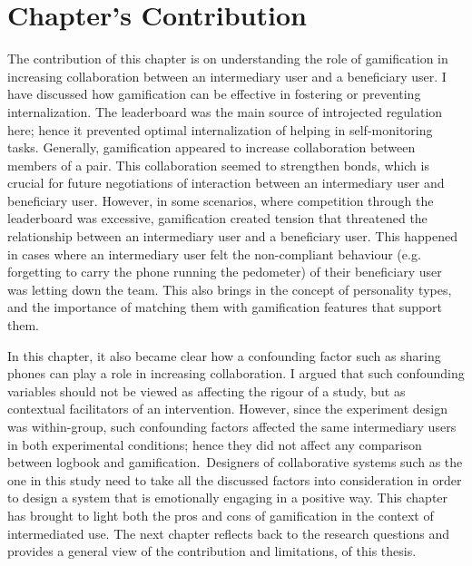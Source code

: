 \section{Chapter's Contribution}
The contribution of this chapter is on understanding the role of gamification in increasing collaboration between an intermediary user and a beneficiary user. I have discussed how gamification can be effective in fostering or preventing internalization. The leaderboard was the main source of introjected regulation here; hence it prevented optimal internalization of helping in self-monitoring tasks. Generally, gamification appeared to increase collaboration between members of a pair. This collaboration seemed to strengthen bonds, which is crucial for future negotiations of interaction between an intermediary user and beneficiary user. However, in some scenarios, where competition through the leaderboard was excessive, gamification created tension that threatened the relationship between an intermediary user and a beneficiary user. This happened in cases where an intermediary user felt the non-compliant behaviour (e.g. forgetting to carry the phone running the pedometer) of their beneficiary user was letting down the team.  This also brings in the concept of personality types, and the importance of matching them with gamification features that support them.

In this chapter, it also became clear how a confounding factor such as sharing phones can play a role in increasing collaboration. I argued that such confounding variables should not be viewed as affecting the rigour of a study, but as contextual facilitators of an intervention. However, since the experiment design was within-group, such confounding factors affected the same intermediary users in both experimental conditions; hence they did not affect any comparison between logbook and gamification.~Designers of collaborative systems such as the one in this study need to take all the discussed factors into consideration in order to design a system that is emotionally engaging in a positive way. This chapter has brought to light both the pros and cons of gamification in the context of intermediated use. The next chapter reflects back to the research questions and provides a general view of the contribution and limitations, of this thesis.
\begin{flushright}
\end{flushright}

